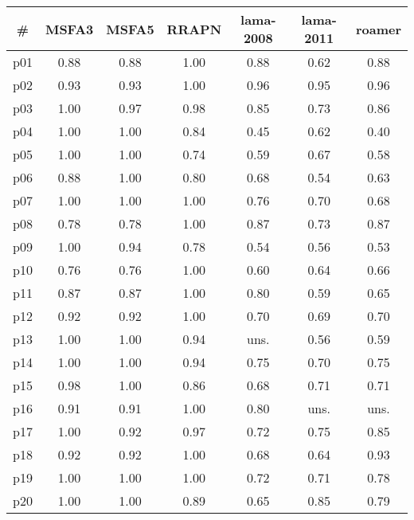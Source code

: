 \begin{tabular}{c||c|c|c|c|c|c}
\textbf{\#} & \textbf{MSFA3} & \textbf{MSFA5} & \textbf{RRAPN} & \textbf{lama-2008} & \textbf{lama-2011} & \textbf{roamer}\\
\hline
\hline
p01 & 0.88 & 0.88 & 1.00 & 0.88 & 0.62 & 0.88\\
p02 & 0.93 & 0.93 & 1.00 & 0.96 & 0.95 & 0.96\\
p03 & 1.00 & 0.97 & 0.98 & 0.85 & 0.73 & 0.86\\
p04 & 1.00 & 1.00 & 0.84 & 0.45 & 0.62 & 0.40\\
p05 & 1.00 & 1.00 & 0.74 & 0.59 & 0.67 & 0.58\\
p06 & 0.88 & 1.00 & 0.80 & 0.68 & 0.54 & 0.63\\
p07 & 1.00 & 1.00 & 1.00 & 0.76 & 0.70 & 0.68\\
p08 & 0.78 & 0.78 & 1.00 & 0.87 & 0.73 & 0.87\\
p09 & 1.00 & 0.94 & 0.78 & 0.54 & 0.56 & 0.53\\
p10 & 0.76 & 0.76 & 1.00 & 0.60 & 0.64 & 0.66\\
p11 & 0.87 & 0.87 & 1.00 & 0.80 & 0.59 & 0.65\\
p12 & 0.92 & 0.92 & 1.00 & 0.70 & 0.69 & 0.70\\
p13 & 1.00 & 1.00 & 0.94 & uns. & 0.56 & 0.59\\
p14 & 1.00 & 1.00 & 0.94 & 0.75 & 0.70 & 0.75\\
p15 & 0.98 & 1.00 & 0.86 & 0.68 & 0.71 & 0.71\\
p16 & 0.91 & 0.91 & 1.00 & 0.80 & uns. & uns.\\
p17 & 1.00 & 0.92 & 0.97 & 0.72 & 0.75 & 0.85\\
p18 & 0.92 & 0.92 & 1.00 & 0.68 & 0.64 & 0.93\\
p19 & 1.00 & 1.00 & 1.00 & 0.72 & 0.71 & 0.78\\
p20 & 1.00 & 1.00 & 0.89 & 0.65 & 0.85 & 0.79\\
\end{tabular}

